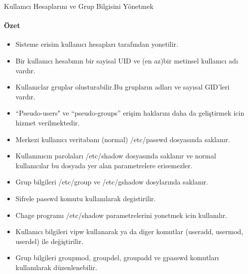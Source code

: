 \begin{section}{Kullanıcı Hesaplarını ve Grup Bilgisini Yönetmek}
\paragraph{Özet}{
\begin{itemize}
\item Sisteme erisim kullanıcı hesapları tarafından yonetilir.
\item Bir kullanıcı hesabının bir sayisal UID ve (en az)bir metinsel kullanıcı adı vardır.
\item Kullanıclar gruplar olusturabilir.Bu grupların adları ve sayısal GID'leri vardır.
\item “Pseudo-users" ve “pseudo-groups” erişim haklarını daha da geliştirmek icin hizmet verilmektedir.
\item Merkezi kullanıcı veritabanı (normal) /etc/passwd dosyasında saklanır.
\item Kullanınıcın parolaları /etc/shadow dosyasında saklanır ve normal kullanıcılar bu dosyada yer alan parametrelere erisemezler.
\item Grup bilgileri /etc/group ve /etc/gshadow dosylarında saklanır.
\item Sifrele passwd komutu kullanılarak degistirilir.
\item Chage programı /etc/shadow parametrelerini yonetmek icin kullanılır.
\item Kullanıcı bilgileri vipw kullanarak ya da diger komutlar (useradd, usermod, userdel) ile değiştirilir.
\item Grup bilgileri groupmod, groupdel, groupadd ve gpasswd komutları kullanılarak düzenlenebilir.
\end{itemize}}
\end{section}